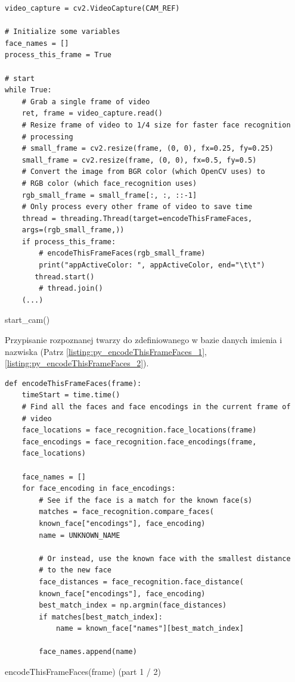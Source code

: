 \documentclass[a4paper,12pt,reqno]{article}
\begin{document}
\begin{listing}[H]%
\begin{mdframed}[backgroundcolor=codebg]
\begin{verbatim}
video_capture = cv2.VideoCapture(CAM_REF)

# Initialize some variables
face_names = []
process_this_frame = True

# start
while True:
    # Grab a single frame of video
    ret, frame = video_capture.read()
    # Resize frame of video to 1/4 size for faster face recognition
    # processing
    # small_frame = cv2.resize(frame, (0, 0), fx=0.25, fy=0.25)
    small_frame = cv2.resize(frame, (0, 0), fx=0.5, fy=0.5)
    # Convert the image from BGR color (which OpenCV uses) to 
    # RGB color (which face_recognition uses)
    rgb_small_frame = small_frame[:, :, ::-1]
    # Only process every other frame of video to save time
    thread = threading.Thread(target=encodeThisFrameFaces, 
    args=(rgb_small_frame,))
    if process_this_frame:
        # encodeThisFrameFaces(rgb_small_frame)
        print("appActiveColor: ", appActiveColor, end="\t\t")
       thread.start()
        # thread.join()
	(...)
\end{verbatim}
\end{mdframed}
\caption{start\_cam()}
\label{listing:py_camAndStaff}
\end{listing}

\newpage
Przypisanie rozpoznanej twarzy do zdefiniowanego w bazie danych imienia i nazwiska (Patrz \ref{listing:py_encodeThisFrameFaces_1}, \ref{listing:py_encodeThisFrameFaces_2}).
\begin{listing}[H]%
\begin{mdframed}[backgroundcolor=codebg]
\begin{verbatim}
def encodeThisFrameFaces(frame):
	timeStart = time.time()
    # Find all the faces and face encodings in the current frame of
    # video
    face_locations = face_recognition.face_locations(frame)
    face_encodings = face_recognition.face_encodings(frame, 
    face_locations)

    face_names = []
    for face_encoding in face_encodings:
        # See if the face is a match for the known face(s)
        matches = face_recognition.compare_faces(
        known_face["encodings"], face_encoding)
        name = UNKNOWN_NAME

        # Or instead, use the known face with the smallest distance
        # to the new face
        face_distances = face_recognition.face_distance(
        known_face["encodings"], face_encoding)
        best_match_index = np.argmin(face_distances)
        if matches[best_match_index]:
            name = known_face["names"][best_match_index]

        face_names.append(name)
\end{verbatim}
\end{mdframed}
\caption{encodeThisFrameFaces(frame) (part 1 / 2)}
\label{listing:py_encodeThisFrameFaces_1}
\end{listing}
\end{document}
